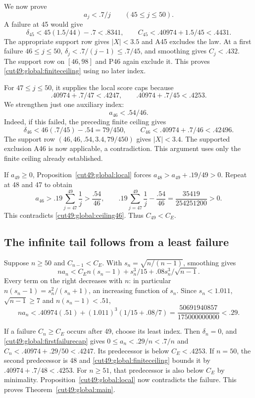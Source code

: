 \documentclass[11pt,a4paper]{article}
\numberwithin{equation}{section}
\theoremstyle{definition}
\theoremstyle{remark}
\begin{document}
We now prove
\begin{equation}\label{cut49:global:finiteceiling}
                     a_j<.7/j\qquad(45\le j\le50).
\end{equation}
A failure at 45 would give
\[
 \delta_{45}<45(1.5/44)-.7<.8341,
 \qquad C_{45}<.40974+1.5/45<.4431.
\]
The appropriate support row gives $|X|<3.5$ and A45 excludes the law.
At a first failure $46\le j\le50$,
$\delta_j<.7/(j-1)\le.7/45$, and smoothing gives $C_j<.432$.
The support row on $[46,98]$ and P46 again exclude it.
This proves \eqref{cut49:global:finiteceiling} using no later index.

For $47\le j\le50$, it supplies the local score caps because
\[
 .40974+.7/47<.4247,\qquad .40974+.7/45<.4253.
\]
We strengthen just one auxiliary index:
\begin{equation}\label{cut49:global:ceiling46}
                        a_{46}<.54/46.
\end{equation}
Indeed, if this failed, the preceding finite ceiling gives
\[
 \delta_{46}<46(.7/45)-.54=79/450,
 \qquad C_{46}<.40974+.7/46<.42496.
\]
The support row $(46,46,.54,3.4,79/450)$ gives $|X|<3.4$.
The supported exclusion A46 is now applicable, a contradiction.
This argument uses only the finite ceiling already established.

If $a_{49}\ge0$, Proposition~\ref{cut49:global:local} forces
$a_{48}>a_{49}+.19/49>0$. Repeat at 48 and 47 to obtain
\[
 a_{46}>.19\sum_{j=47}^{49}\frac1j>\frac{.54}{46},\qquad
 .19\sum_{j=47}^{49}\frac1j-\frac{.54}{46}
       =\frac{35419}{254251200}>0.
\]
This contradicts \eqref{cut49:global:ceiling46}. Thus $C_{49}<C_E$.

\subsection{The infinite tail follows from a least failure}
Suppose $n\ge50$ and $C_{n-1}<C_E$. With $s_n=\sqrt{n/(n-1)}$,
smoothing gives
\[
 na_n<C_E n(s_n-1)+s_n^3/15+.08s_n^3/\sqrt{n-1}.
\]
Every term on the right decreases with $n$: in particular
$n(s_n-1)=s_n^2/(s_n+1)$, an increasing function of $s_n$.
Since $s_n<1.011$, $\sqrt{n-1}\ge7$ and $n(s_n-1)<.51$,
\begin{equation}\label{cut49:global:firstfailurecap}
 na_n<.40974(.51)+(1.011)^3(1/15+.08/7)
        =\frac{50691940857}{175000000000}<.29.
\end{equation}

If a failure $C_n\ge C_E$ occurs after 49, choose its least index.
Then $\delta_n=0$, and \eqref{cut49:global:firstfailurecap} gives
$0\le a_n<.29/n<.7/n$ and $C_n<.40974+.29/50<.4247$.
Its predecessor is below $C_E<.4253$. If $n=50$, the second
predecessor is 48 and \eqref{cut49:global:finiteceiling} bounds it by
$.40974+.7/48<.4253$. For $n\ge51$, that predecessor is also
below $C_E$ by minimality. Proposition~\ref{cut49:global:local} now
contradicts the failure. This proves Theorem~\ref{cut49:global:main}.
\end{document}
